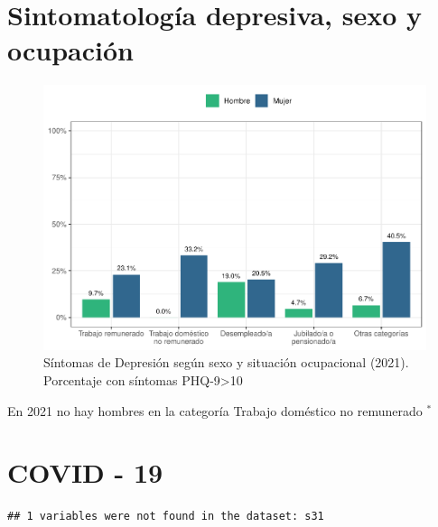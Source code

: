 \documentclass[
  12pt,
  openany]{book}
\begin{document}
\hypertarget{sintomatologuxeda-depresiva-sexo-y-ocupaciuxf3n}{%
\section{Sintomatología depresiva, sexo y ocupación}\label{sintomatologuxeda-depresiva-sexo-y-ocupaciuxf3n}}

\begin{figure}

{\centering \includegraphics{reporte-elsoc_files/figure-latex/depre-labstat-1} 

}

\caption{Síntomas de Depresión según sexo y situación ocupacional (2021). Porcentaje con síntomas PHQ-9>10}\label{fig:depre-labstat}
\end{figure}

En 2021 no hay hombres en la categoría Trabajo doméstico no remunerado \(^{*}\)

\hypertarget{covid---19}{%
\section{COVID - 19}\label{covid---19}}

\begin{verbatim}
## 1 variables were not found in the dataset: s31
\end{verbatim}
\end{document}
